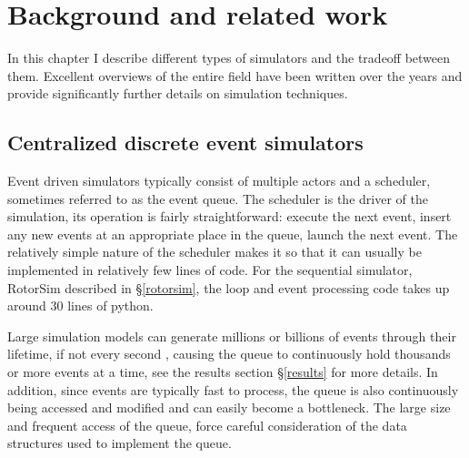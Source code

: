 \chapter{Background and related work} \label{background}

In this chapter I describe different types of simulators and the tradeoff between them.
Excellent overviews of the entire field have been written over the years \cite{fujimoto_parallel_2001, fujimoto_computational_2017} and provide significantly further details on simulation techniques.

\section{Centralized discrete event simulators} \label{centralized-sim}

Event driven simulators typically consist of multiple actors and a scheduler, sometimes referred to as the event queue.
The scheduler is the driver of the simulation, its operation is fairly straightforward: execute the next event, insert any new events at an appropriate place in the queue, launch the next event.
The relatively simple nature of the scheduler makes it so that it can usually be implemented in relatively few lines of code.
For the sequential simulator, RotorSim\cite{brode-roger_nibriviarotorsim_2020} described in \S \ref{rotorsim}, the loop and event processing code takes up around 30 lines of python.

Large simulation models can generate millions or billions of events through their lifetime, if not every second \cite{fujimoto_parallel_2015}, causing the queue to continuously hold thousands or more events at a time, see the results section \S\ref{results} for more details.
In addition, since events are typically fast to process, the queue is also continuously being accessed and modified and can easily become a bottleneck.
The large size and frequent access of the queue, force careful consideration of the data structures used to implement the queue.

